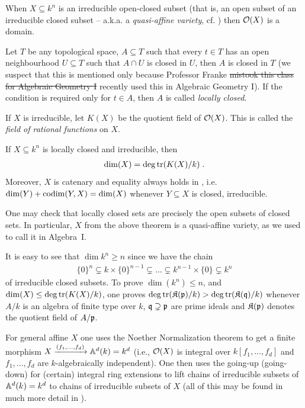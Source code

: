\documentclass[a4paper,parskip=half,numbers=enddot, DIV=12]{scrreprt}
\begin{document}
\begin{rem}
	When $X\subseteq k^n$ is an irreducible open-closed subset (that is, an open subset of an irreducible closed subset -- a.k.a. a \emph{quasi-affine variety}, cf. \cite[Definition~2.2.1]{alg1}) then $\mathcal{O}(X)$ is a domain. 
\end{rem}
\begin{rem}
	Let $T$ be any topological space, $A\subseteq T$ such that every $t\in T$ has an open neighbourhood $U\subseteq T$ such that $A\cap U$ is closed in $U$, then $A$ is closed in $T$ (we suspect that this is mentioned only because Professor Franke \sout{mistook this class for Algebraic Geometry I} recently used this in Algebraic Geometry I). If the condition is required only for $t\in A$, then $A$ is called \emph{locally closed}.
\end{rem}
If $X$ is irreducible, let $K(X)$ be the quotient field of $\mathcal{O}(X)$. This is called the \emph{field of rational functions} on $X$.
\begin{thm}
	If $X\subseteq k^n$ is locally closed and irreducible, then
	\begin{align*}
	\dim(X) = \deg\operatorname{tr} (K(X)/k)\;.
	\end{align*}
	Moreover, $X$ is catenary and equality always holds in , i.e.\ $\dim (Y) +\operatorname{codim}(Y,X) = \dim (X)$ whenever $Y\subseteq X$ is closed, irreducible.
\end{thm}
One may check that locally closed sets are precisely the open subsets of closed sets. In particular, $X$ from the above theorem is a quasi-affine variety, as we used to call it in Algebra~I.
\begin{rem}
	It is easy to see that $\dim k^n \geq n$ since we have the chain
	\begin{align*}
	\{0\}^n \subsetneq k\times\{0\}^{n-1} \subsetneq\ldots\subsetneq k^{n-1}\times\{0\} \subsetneq k^n
	\end{align*} of irreducible closed subsets. To prove $\dim(k^n) \leq n$, and $\dim (X) \leq\deg\operatorname{tr}(K(X)/k)$, one proves $\deg\operatorname{tr}(\mathfrak{K}(\mathfrak{p})/k) > \deg\operatorname{tr}(\mathfrak{K}(\mathfrak{q})/k)$ whenever $A/k$ is an algebra of finite type over $k$, $\mathfrak{q}\supsetneq \mathfrak{p}$ are prime ideals and $\mathfrak{K}(\mathfrak{p})$ denotes the quotient field of $A/\mathfrak{p}$. 
	
	For general affine $X$ one uses the Noether Normalization theorem to get a finite morphism $X\xrightarrow{(f_1,\ldots,f_d)} \mathbb{A}^d(k)=k^d$ (i.e., $\mathcal{O}(X)$ is integral over $k[f_1,\ldots,f_d]$ and $f_1,\ldots,f_d$ are $k$-algebraically independent). One then uses the going-up (going-down) for (certain) integral ring extensions to lift chains of irreducible subsets of $\mathbb{A}^d(k)=k^d$ to chains of irreducible subsets of $X$ (all of this may be found in much more detail in \cite[Section~2.4-2.6]{alg1}).
\end{rem}
\end{document}

